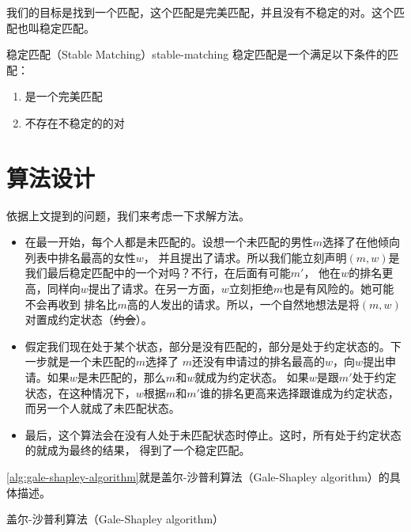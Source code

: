 我们的目标是找到一个匹配，这个匹配是完美匹配，并且没有不稳定的对。这个匹配也叫稳定匹配。
\begin{definition}{稳定匹配（Stable Matching）}{stable-matching}
	稳定匹配是一个满足以下条件的匹配：
	\begin{enumerate}[label=(\roman*)]
		\item 是一个完美匹配
		\item 不存在不稳定的的对
	\end{enumerate}
\end{definition}

\section{算法设计}\label{sec:stable-matching-algorithm}
依据上文提到的问题，我们来考虑一下求解方法。
\begin{itemize}[label=$\ast$]
	\item 在最一开始，每个人都是未匹配的。设想一个未匹配的男性$m$选择了在他倾向列表中排名最高的女性$w$，
	      并且提出了请求。所以我们能立刻声明$(m,w)$是我们最后稳定匹配中的一个对吗？不行，在后面有可能$m'$，
	      他在$w$的排名更高，同样向$w$提出了请求。在另一方面，$w$立刻拒绝$m$也是有风险的。她可能不会再收到
	      排名比$m$高的人发出的请求。所以，一个自然地想法是将$(m,w)$对置成约定状态（\sout{约会}）。
	\item 假定我们现在处于某个状态，部分是没有匹配的，部分是处于约定状态的。下一步就是一个未匹配的$m$选择了
	      $m$还没有申请过的排名最高的$w$，向$w$提出申请。如果$w$是未匹配的，那么$m$和$w$就成为约定状态。
	      如果$w$是跟$m'$处于约定状态，在这种情况下，$w$根据$m$和$m'$谁的排名更高来选择跟谁成为约定状态，
	      而另一个人就成了未匹配状态。
	\item 最后，这个算法会在没有人处于未匹配状态时停止。这时，所有处于约定状态的就成为最终的结果，
	      得到了一个稳定匹配。
\end{itemize}
\autoref{alg:gale-shapley-algorithm}就是盖尔-沙普利算法（Gale-Shapley algorithm）的具体描述。
\begin{algorithm}
	\caption{盖尔-沙普利算法（Gale-Shapley algorithm）}\label{alg:gale-shapley-algorithm}
\end{algorithm}

